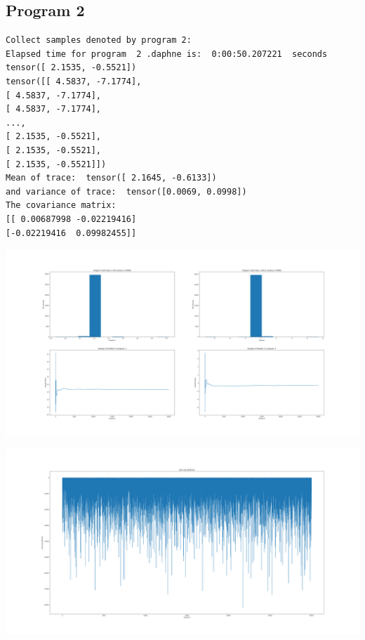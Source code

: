 \documentclass[]{article}
\begin{document}
\subsection{Program 2}
\begin{verbatim}
Collect samples denoted by program 2:
Elapsed time for program  2 .daphne is:  0:00:50.207221  seconds
tensor([ 2.1535, -0.5521])
tensor([[ 4.5837, -7.1774],
[ 4.5837, -7.1774],
[ 4.5837, -7.1774],
...,
[ 2.1535, -0.5521],
[ 2.1535, -0.5521],
[ 2.1535, -0.5521]])
Mean of trace:  tensor([ 2.1645, -0.6133])  
and variance of trace:  tensor([0.0069, 0.0998])
The covariance matrix:  
[[ 0.00687998 -0.02219416]
[-0.02219416  0.09982455]]
\end{verbatim}
\begin{center}
	\includegraphics[width=\linewidth]{Figures/p2_IS.png}
\end{center}
\begin{center}
	\includegraphics[width=\linewidth]{Figures/p2_ISjll.png}
\end{center}
\end{document}
